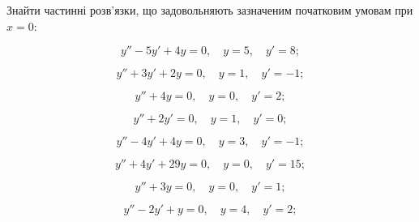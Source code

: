 Знайти частинні розв'язки, що задовольняють зазначеним початковим умовам при $x=0$:
\begin{problem}
	\[y''-5y'+4y=0,\quad y=5,\quad y'=8;\]
\end{problem}

\begin{problem}
	\[y''+3y'+2y=0,\quad y=1,\quad y'=-1;\]
\end{problem}

\begin{problem}
	\[y''+4y=0,\quad y=0,\quad y'=2;\]
\end{problem}

\begin{problem}
	\[y''+2y'=0,\quad y=1,\quad y'=0;\]
\end{problem}

\begin{problem}
	\[y''-4y'+4y=0,\quad y=3,\quad y'=-1;\]
\end{problem}

\begin{problem}
	\[y''+4y'+29y=0,\quad y=0,\quad y'=15;\]
\end{problem}

\begin{problem}
	\[y''+3y=0,\quad y=0,\quad y'=1;\]
\end{problem}

\begin{problem}
	\[y''-2y'+y=0,\quad y=4,\quad y'=2;\]
\end{problem}

